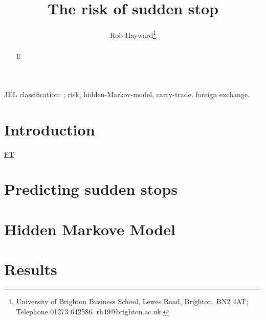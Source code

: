 \documentclass[preprint,12pt,authoryear]{elsarticle}
\begin{document}
\begin{frontmatter}
\title{The risk of sudden stop}
\author{Rob Hayward\footnote{University of Brighton Business School, Lewes Road, Brighton, BN2 4AT; Telephone 01273 642586.  rh49@brighton.ac.uk.}}

\begin{abstract}
If       
\end{abstract}
\begin{keyword}
JEL classification: ; risk, hidden-Markov-model, carry-trade, foreign exchange.
\end{keyword}

\end{frontmatter}
\section*{Introduction}
\href{https://next.ft.com/content/d73e27de-78d4-11e5-a95a-27d368e1ddf7}{FT}
\section*{Predicting sudden stops}
\section*{Hidden Markove Model}
\section*{Results}
\end{document}

